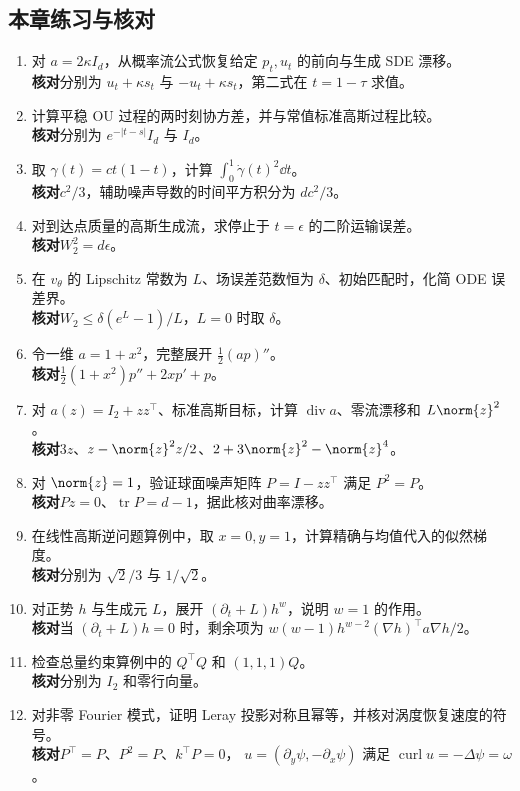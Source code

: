 \subsection*{本章练习与核对}

\begin{enumerate}
 \item 对 \(a=2\kappa I_d\)，从概率流公式恢复给定 \(p_t,u_t\) 的前向与生成 SDE 漂移。\\
 \textbf{核对}\quad 分别为 \(u_t+\kappa s_t\) 与 \(-u_t+\kappa s_t\)，第二式在 \(t=1-\tau\) 求值。
 \item 计算平稳 OU 过程的两时刻协方差，并与常值标准高斯过程比较。\\
 \textbf{核对}\quad 分别为 \(e^{-|t-s|}I_d\) 与 \(I_d\)。
 \item 取 \(\gamma(t)=ct(1-t)\)，计算 \(\int_0^1\dot\gamma(t)^2\dd t\)。\\
 \textbf{核对}\quad \(c^2/3\)，辅助噪声导数的时间平方积分为 \(dc^2/3\)。
 \item 对到达点质量的高斯生成流，求停止于 \(t=\epsilon\) 的二阶运输误差。\\
 \textbf{核对}\quad \(W_2^2=d\epsilon\)。
 \item 在 \(v_\theta\) 的 Lipschitz 常数为 \(L\)、场误差范数恒为 \(\delta\)、初始匹配时，化简 ODE 误差界。\\
 \textbf{核对}\quad \(W_2\le\delta(e^L-1)/L\)，\(L=0\) 时取 \(\delta\)。
 \item 令一维 \(a=1+x^2\)，完整展开 \(\tfrac12(ap)''\)。\\
 \textbf{核对}\quad \(\tfrac12(1+x^2)p''+2xp'+p\)。
 \item 对 \(a(z)=I_2+zz^\top\)、标准高斯目标，计算 \(\operatorname{div}a\)、零流漂移和 \(L\norm{z}^2\)。\\
 \textbf{核对}\quad \(3z\)、\(z-\norm{z}^2z/2\)、\(2+3\norm{z}^2-\norm{z}^4\)。
 \item 对 \(\norm{z}=1\)，验证球面噪声矩阵 \(P=I-zz^\top\) 满足 \(P^2=P\)。\\
 \textbf{核对}\quad \(Pz=0\)、\(\operatorname{tr}P=d-1\)，据此核对曲率漂移。
 \item 在线性高斯逆问题算例中，取 \(x=0,y=1\)，计算精确与均值代入的似然梯度。\\
 \textbf{核对}\quad 分别为 \(\sqrt2/3\) 与 \(1/\sqrt2\)。
 \item 对正势 \(h\) 与生成元 \(L\)，展开 \((\partial_t+L)h^w\)，说明 \(w=1\) 的作用。\\
 \textbf{核对}\quad 当 \((\partial_t+L)h=0\) 时，剩余项为
 \(w(w-1)h^{w-2}(\nabla h)^\top a\nabla h/2\)。
 \item 检查总量约束算例中的 \(Q^\top Q\) 和 \((1,1,1)Q\)。\\
 \textbf{核对}\quad 分别为 \(I_2\) 和零行向量。
 \item 对非零 Fourier 模式，证明 Leray 投影对称且幂等，并核对涡度恢复速度的符号。\\
 \textbf{核对}\quad \(P^\top=P\)、\(P^2=P\)、\(k^\top P=0\)，
 \(u=(\partial_y\psi,-\partial_x\psi)\) 满足 \(\operatorname{curl}u=-\Delta\psi=\omega\)。
\end{enumerate}
